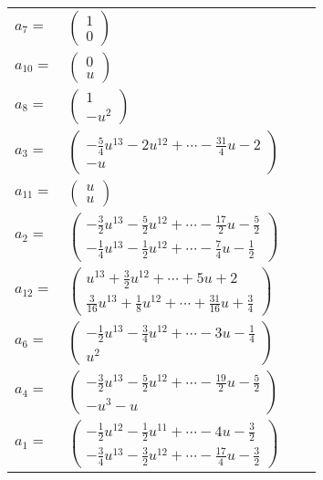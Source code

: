 \documentclass[1p]{elsarticle_modified}
\theoremstyle{definition}
\begin{document}
\begin{tabular}{m{7pt} m{180pt} m{7pt} m{180pt} }
\flushright $a_{7}=$&$\begin{pmatrix}1\\0\end{pmatrix}$ \\
\flushright $a_{10}=$&$\begin{pmatrix}0\\u\end{pmatrix}$ \\
\flushright $a_{8}=$&$\begin{pmatrix}1\\- u^2\end{pmatrix}$ \\
\flushright $a_{3}=$&$\begin{pmatrix}-\frac{5}{4} u^{13}-2 u^{12}+\cdots-\frac{31}{4} u-2\\- u\end{pmatrix}$ \\
\flushright $a_{11}=$&$\begin{pmatrix}u\\u\end{pmatrix}$ \\
\flushright $a_{2}=$&$\begin{pmatrix}-\frac{3}{2} u^{13}-\frac{5}{2} u^{12}+\cdots-\frac{17}{2} u-\frac{5}{2}\\-\frac{1}{4} u^{13}-\frac{1}{2} u^{12}+\cdots-\frac{7}{4} u-\frac{1}{2}\end{pmatrix}$ \\
\flushright $a_{12}=$&$\begin{pmatrix}u^{13}+\frac{3}{2} u^{12}+\cdots+5 u+2\\\frac{3}{16} u^{13}+\frac{1}{8} u^{12}+\cdots+\frac{31}{16} u+\frac{3}{4}\end{pmatrix}$ \\
\flushright $a_{6}=$&$\begin{pmatrix}-\frac{1}{2} u^{13}-\frac{3}{4} u^{12}+\cdots-3 u-\frac{1}{4}\\u^2\end{pmatrix}$ \\
\flushright $a_{4}=$&$\begin{pmatrix}-\frac{3}{2} u^{13}-\frac{5}{2} u^{12}+\cdots-\frac{19}{2} u-\frac{5}{2}\\- u^3- u\end{pmatrix}$ \\
\flushright $a_{1}=$&$\begin{pmatrix}-\frac{1}{2} u^{12}-\frac{1}{2} u^{11}+\cdots-4 u-\frac{3}{2}\\-\frac{3}{4} u^{13}-\frac{3}{2} u^{12}+\cdots-\frac{17}{4} u-\frac{3}{2}\end{pmatrix}$ \\

\end{tabular}
\end{document}
